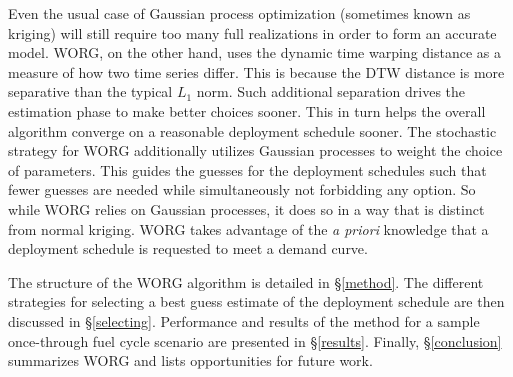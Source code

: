 Even the usual case of 
Gaussian process optimization (sometimes known as kriging) 
\cite{osborne2009gaussian,simpson2001kriging} will still 
require too many full realizations in order to form an accurate model.
WORG, on the other hand, uses the dynamic time warping distance as a 
measure of how two time series differ. This is because the DTW distance is 
more separative than the typical
$L_1$ norm. Such additional separation drives the estimation phase to make 
better choices
sooner. This in turn helps the overall algorithm converge on a reasonable 
deployment schedule sooner. 
The stochastic strategy for WORG additionally utilizes Gaussian processes to 
weight the choice of parameters. This guides the guesses for the deployment
schedules such that fewer guesses are needed while simultaneously 
not forbidding  
any option.  So while WORG relies on Gaussian processes, it does so in a way
that is distinct from normal kriging. WORG
takes advantage of the \emph{a priori} knowledge that a deployment 
schedule is requested to meet a demand curve. 

The structure of the WORG algorithm is detailed in \S\ref{method}. 
The different strategies for selecting a best guess estimate of the 
deployment schedule are then discussed in \S\ref{selecting}. Performance
and results of the method for a sample once-through fuel cycle scenario 
are presented in \S\ref{results}. Finally, \S\ref{conclusion} summarizes
WORG and lists opportunities for future work.
